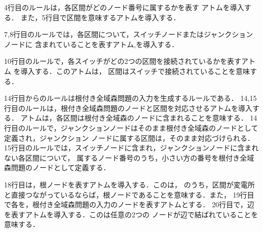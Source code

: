 4行目のルールは，各区間がどのノード番号に属するかを表す
アトムを導入する．
また，5行目で区間を意味するアトムを導入する．

7,8行目のルールでは，各区間について，スイッチノードまたはジャンクションノードに
含まれていることを表すアトム,を導入する．

10行目のルールで，各スイッチがどの2つの区間を接続されているかを表すアトム
を導入する．このアトムは，
区間はスイッチで接続されていることを意味する．

14行目からのルールは根付き全域森問題の入力を生成するルールである．
14,15行目のルールは，根付き全域森問題のノードと区間を対応させるアトムを導入する．
アトムは，各区間は根付き全域森のノードに含まれることを意味する．
14行目のルールで，ジャンクションノードはそのまま根付き全域森のノードとして定義され，ジャンクション
ノードに属する区間は，そのまま対応づけられる．
15行目のルールでは，スイッチノードに含まれ，ジャンクションノードに含まれない各区間について，
属するノード番号のうち，小さい方の番号を根付き全域森問題のノードとして定義する．

18行目は，根ノードを表すアトムを導入する．このは，
のうち，区間が変電所と直接つながっているならば，根ノードであることを意味する．また，
19行目で各を，根付き全域森問題の入力のノードを表すアトムとする．
20行目で，辺を表すアトムを導入する．このは任意の2つの
ノードが辺で結ばれていることを意味する．






